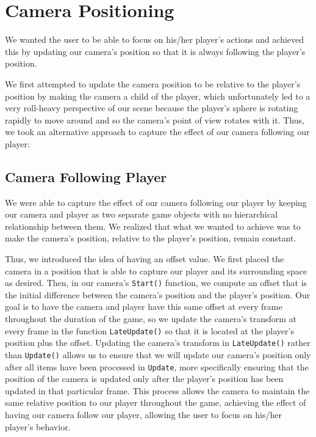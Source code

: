 \documentclass[12pt]{article}
\begin{document}
\section{Camera Positioning}
  We wanted the user to be able to focus on his/her player's actions and achieved this by updating our camera's position so that it is always following the player's position. 

  We first attempted to update the camera position to be relative to the player's position by making the camera a child of the player, which unfortunately led to a very roll-heavy perspective of our scene because the player's sphere is rotating rapidly to move around and so the camera's point of view rotates with it. Thus, we took an alternative approach to capture the effect of our camera following our player: 

\subsection{Camera Following Player}
  We were able to capture the effect of our camera following our player by keeping our camera and player as two separate game objects with no hierarchical relationship between them.
  We realized that what we wanted to achieve was to make the camera's position, relative to the player's position, remain constant. 

  Thus, we introduced the idea of having an offset value.
  We first placed the camera in a position that is able to capture our player and its surrounding space as desired. 
  Then, in our camera's \verb+Start()+ function, we compute an offset that is the initial difference between the camera's position and the player's position. 
  Our goal is to have the camera and player have this same offset at every frame throughout the duration of the game, so we update the camera's transform at every frame in the function \verb+LateUpdate()+ so that it is located at the player's position plus the offset. 
  Updating the camera's transform in \verb+LateUpdate()+ rather than \verb+Update()+ allows us to ensure that we will update our camera's position only after all items have been processed in \verb+Update+, more specifically ensuring that the position of the camera is updated only after the player's position has been updated in that particular frame.
  This process allows the camera to maintain the same relative position to our player throughout the game, achieving the effect of having our camera follow our player, allowing the user to focus on his/her player's behavior.
\end{document}
